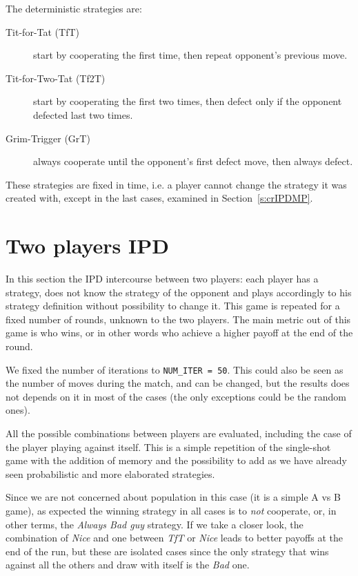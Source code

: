 \documentclass[journal,a4paper,10pt,twoside]{IEEEtran} %
\begin{document}
The deterministic strategies are:
\begin{description}
    \item[Tit-for-Tat (TfT)] start by cooperating the first time, then repeat opponent's previous move.
    \item[Tit-for-Two-Tat (Tf2T)] start by cooperating the first two times, then defect only if the opponent defected last two times.
    \item[Grim-Trigger (GrT)] always cooperate until the opponent's first defect move, then always defect. 
\end{description}

These strategies are fixed in time, i.e. a player cannot change the strategy it was created with, except in the last cases, examined in Section~\ref{s:crIPDMP}.

\section{Two players IPD} \label{s:IPD2P}
In this section the IPD intercourse between two players: each player has a strategy, does not know the strategy of the opponent and plays accordingly to his strategy definition without possibility to change it. This game is repeated for a fixed number of rounds, unknown to the two players. The main metric out of this game is who wins, or in other words who achieve a higher payoff at the end of the round.

We fixed the number of iterations to \texttt{NUM\_ITER = 50}. This could also be seen as the number of moves during the match, and can be changed, but the results does not depends on it in most of the cases (the only exceptions could be the random ones).

All the possible combinations between players are evaluated, including the case of the player playing against itself.
This is a simple repetition of the single-shot game with the addition of memory and the possibility to add as we have already seen probabilistic and more elaborated strategies.

Since we are not concerned about population in this case (it is a simple A vs B game), as expected the winning strategy in all cases is to \textit{not} cooperate, or, in other terms, the \textit{Always Bad guy} strategy.
If we take a closer look, the combination of \textit{Nice} and one between \textit{TfT} or \textit{Nice} leads to better payoffs at the end of the run, but these are isolated cases since the only strategy that wins against all the others and draw with itself is the \textit{Bad} one.
\end{document}
